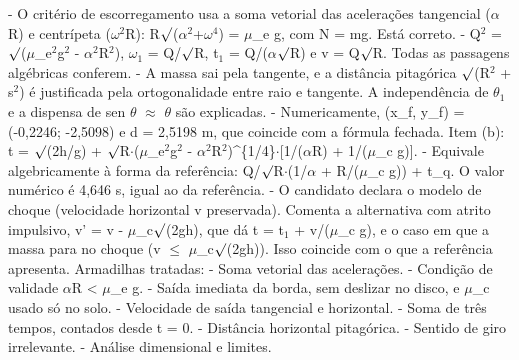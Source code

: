 \documentclass{article}%
\begin{document}
{-} O critério de escorregamento usa a soma vetorial das acelerações tangencial ($\alpha$R) e centrípeta ($\omega$$^2$R): R$\surd$($\alpha$$^2$+$\omega$$^{4}$) = $\mu$\_e g, com N = mg. Está correto.\newline%
{-} Q$^2$ = $\surd$($\mu$\_e$^2$g$^2$ - $\alpha$$^2$R$^2$), $\omega$$_{1}$ = Q/$\surd$R, t$_{1}$ = Q/($\alpha$$\surd$R) e v = Q$\surd$R. Todas as passagens algébricas conferem.\newline%
{-} A massa sai pela tangente, e a distância pitagórica $\surd$(R$^2$ + s$^2$) é justificada pela ortogonalidade entre raio e tangente. A independência de $\theta$$_{1}$ e a dispensa de sen $\theta$ $\approx$ $\theta$ são explicadas.\newline%
{-} Numericamente, (x\_f, y\_f) = (-0,2246; -2,5098) e d = 2,5198 m, que coincide com a fórmula fechada.\newline%
\newline%
Item (b): t = $\surd$(2h/g) + $\surd$R$\cdot$($\mu$\_e$^2$g$^2$ - $\alpha$$^2$R$^2$)\^{}\{1/4\}$\cdot${[}1/($\alpha$R) + 1/($\mu$\_c g){]}.\newline%
{-} Equivale algebricamente à forma da referência: Q/$\surd$R$\cdot$(1/$\alpha$ + R/($\mu$\_c g)) + t\_q. O valor numérico é 4,646 s, igual ao da referência.\newline%
{-} O candidato declara o modelo de choque (velocidade horizontal v preservada). Comenta a alternativa com atrito impulsivo, v' = v - $\mu$\_c$\surd$(2gh), que dá t = t$_{1}$ + v/($\mu$\_c g), e o caso em que a massa para no choque (v $\leq$ $\mu$\_c$\surd$(2gh)). Isso coincide com o que a referência apresenta.\newline%
\newline%
Armadilhas tratadas:\newline%
{-} Soma vetorial das acelerações.\newline%
{-} Condição de validade $\alpha$R < $\mu$\_e g.\newline%
{-} Saída imediata da borda, sem deslizar no disco, e $\mu$\_c usado só no solo.\newline%
{-} Velocidade de saída tangencial e horizontal.\newline%
{-} Soma de três tempos, contados desde t = 0.\newline%
{-} Distância horizontal pitagórica.\newline%
{-} Sentido de giro irrelevante.\newline%
{-} Análise dimensional e limites.\newline%
\newline%
\end{document}
